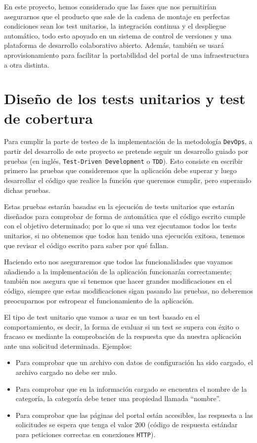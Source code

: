 \bigskip
En este proyecto, hemos considerado que las fases que nos permitirían asegurarnos que el producto que sale de la cadena de montaje en perfectas condiciones sean los test unitarios, la integración continua y el despliegue automático, todo esto apoyado en un sistema de control de versiones y una plataforma de desarrollo colaborativo abierto. Además, también se usará aprovisionamiento para facilitar la portabilidad del portal de una infraestructura a otra distinta. 

\section{Diseño de los tests unitarios y test de cobertura}

Para cumplir la parte de testeo de la implementación de la metodología {\tt DevOps}, a partir del desarrollo de este proyecto se pretende seguir un desarrollo guiado por pruebas (en inglés, {\tt Test-Driven Development} o {\tt TDD}). Esto consiste en escribir primero las pruebas que consideremos que la aplicación debe superar y luego desarrollar el código que realice la función que queremos cumplir, pero superando dichas pruebas. 

\bigskip
Estas pruebas estarán basadas en la ejecución de tests unitarios que estarán diseñados para comprobar de forma de automática que el código escrito cumple con el objetivo determinado; por lo que si una vez ejecutamos todos los tests unitarios, si no obtenemos que todos han tenido una ejecución exitosa, tenemos que revisar el código escrito para saber por qué fallan.

\bigskip
Haciendo esto nos aseguraremos que todos las funcionalidades que vayamos añadiendo a la implementación de la aplicación funcionarán correctamente; también nos asegura que si tenemos que hacer grandes modificaciones en el código, siempre que estas modificaciones sigan pasando las pruebas, no deberemos preocuparnos por estropear el funcionamiento de la aplicación.

\bigskip
El tipo de test unitario que vamos a usar es un test basado en el comportamiento, es decir, la forma de evaluar si un test se supera con éxito o fracaso es mediante la comprobación de la respuesta que da nuestra aplicación ante una solicitud 
determinada. Ejemplos:

\begin{itemize}
 \item Para comprobar que un archivo con datos de configuración ha sido cargado, el archivo cargado no debe ser nulo.
 \item Para comprobar que en la información cargado se encuentra el nombre de la categoría, la categoría debe tener una 
 propiedad llamada ``nombre''.
 \item Para comprobar que las páginas del portal están accesibles, las respuesta a las solicitudes se espera que tenga el valor
 200 (código de respuesta estándar para peticiones correctas en conexiones {\tt HTTP}).
\end{itemize}

